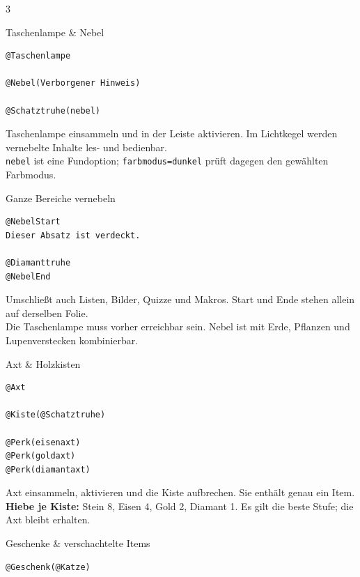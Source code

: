 \documentclass[a4paper,landscape,9pt]{extarticle}
\newcommand{\prevsm}[1]{{\footnotesize\color{muted} #1}}
\begin{document}
\begingroup
\setlength{\multicolsep}{2pt}
\lstset{breakatwhitespace=false,breakautoindent=false}
\begin{multicols}{3}

\begin{lootcard}{Taschenlampe \& Nebel}
\begin{lstlisting}[language=lia]
@Taschenlampe

@Nebel(Verborgener Hinweis)

@Schatztruhe(nebel)
\end{lstlisting}
\tcblower
\prevsm{Taschenlampe einsammeln und in der Leiste aktivieren. Im Lichtkegel werden vernebelte Inhalte les- und bedienbar.\\[2pt]
\texttt{nebel} ist eine Fundoption; \texttt{farbmodus=dunkel} prüft dagegen den gewählten Farbmodus.}
\end{lootcard}

\begin{lootcard}{Ganze Bereiche vernebeln}
\begin{lstlisting}[language=lia]
@NebelStart
Dieser Absatz ist verdeckt.

@Diamanttruhe
@NebelEnd
\end{lstlisting}
\tcblower
\prevsm{Umschließt auch Listen, Bilder, Quizze und Makros. Start und Ende stehen allein auf derselben Folie.\\[2pt]
Die Taschenlampe muss vorher erreichbar sein. Nebel ist mit Erde, Pflanzen und Lupenverstecken kombinierbar.}
\end{lootcard}

\begin{lootcard}{Axt \& Holzkisten}
\begin{lstlisting}[language=lia]
@Axt

@Kiste(@Schatztruhe)

@Perk(eisenaxt)
@Perk(goldaxt)
@Perk(diamantaxt)
\end{lstlisting}
\tcblower
\prevsm{Axt einsammeln, aktivieren und die Kiste aufbrechen. Sie enthält genau ein Item.\\[2pt]
\textbf{Hiebe je Kiste:} Stein 8, Eisen 4, Gold 2, Diamant 1. Es gilt die beste Stufe; die Axt bleibt erhalten.}
\end{lootcard}

\begin{lootcard}{Geschenke \& verschachtelte Items}
\begin{lstlisting}[language=lia]
@Geschenk(@Katze)


\end{lstlisting}
\end{lootcard}
\end{multicols}
\end{document}
